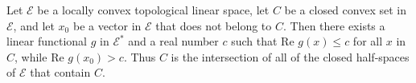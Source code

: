 Let $\mathcal{E}$ be a locally convex topological linear space, let $C$ be a closed convex set in $\mathcal{E}$, and let $x_0$ be a vector in $\mathcal{E}$ that does not belong to $C$. Then there exists a linear functional $g$ in $\mathcal{E}^*$ and a real number $c$ such that $\text{Re } g(x) \leq c$ for all $x$ in $C$, while $\text{Re } g(x_0) > c$. Thus $C$ is the intersection of all of the closed half-spaces of $\mathcal{E}$ that contain $C$.
